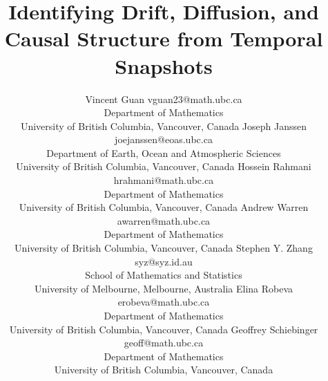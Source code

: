 \documentclass[twoside,11pt]{article}
\newcommand{\yesterday}{{\AdvanceDate[-1]\today}}
\begin{document}
\title{Identifying Drift, Diffusion, and Causal Structure from Temporal Snapshots}

\author{\name Vincent Guan \email vguan23@math.ubc.ca \\
       \addr Department of Mathematics\\
       University of British Columbia, Vancouver, Canada
       \AND
       \name Joseph Janssen \email joejanssen@eoas.ubc.ca \\
       \addr Department of Earth, Ocean and Atmospheric Sciences\\
       University of British Columbia, Vancouver, Canada
       \AND
       \name Hossein Rahmani \email hrahmani@math.ubc.ca \\
       \addr Department of Mathematics\\
       University of British Columbia, Vancouver, Canada
       \AND
       \name Andrew Warren \email awarren@math.ubc.ca \\
       \addr Department of Mathematics\\
       University of British Columbia, Vancouver, Canada
       \AND
       \name Stephen Y. Zhang \email syz@syz.id.au \\
       \addr School of Mathematics and Statistics\\
       University of Melbourne, Melbourne, Australia
       \AND
       \name Elina Robeva \email erobeva@math.ubc.ca \\
       \addr Department of Mathematics\\
       University of British Columbia, Vancouver, Canada
       \AND
       \name Geoffrey Schiebinger \email geoff@math.ubc.ca \\
       \addr Department of Mathematics\\
       University of British Columbia, Vancouver, Canada}




\maketitle
\end{document}

